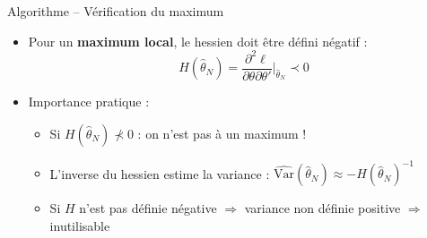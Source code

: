 \documentclass[11pt,aspectratio=169]{beamer}
\begin{document}
\begin{frame}{Algorithme -- Vérification du maximum}

\begin{itemize}

\item Pour un \textbf{maximum local}, le hessien doit être défini négatif :
  \[
  H(\hat{\theta}_N) = \frac{\partial^2 \ell}{\partial \theta \partial \theta'}\bigg|_{\hat{\theta}_N} \prec 0
  \]

\item Importance pratique :
  \begin{itemize}
    \item Si $H(\hat{\theta}_N) \not\prec 0$ : on n'est pas à un maximum !\newline
    \item L'inverse du hessien estime la variance : $\widehat{\mathrm{Var}}(\hat{\theta}_N) \approx -H(\hat{\theta}_N)^{-1}$\newline
    \item Si $H$ n'est pas définie négative $\Rightarrow$ variance non définie positive $\Rightarrow$ inutilisable
  \end{itemize}

\end{itemize}

\end{frame}
\end{document}
